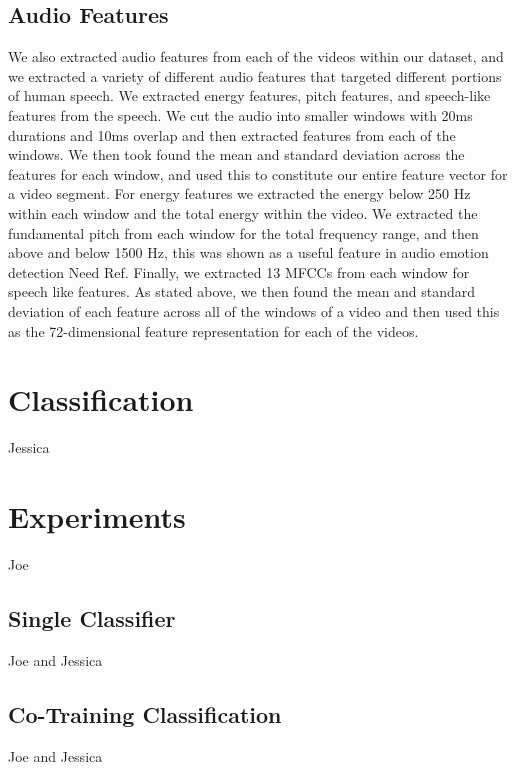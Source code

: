 \documentclass[twoside]{article}
\begin{document}
\begin{multicols}{2}
\subsection{Audio Features}
We also extracted audio features from each of the videos within our dataset, and we extracted a variety of different audio features that targeted different portions of human speech.
We extracted energy features, pitch features, and speech-like features from the speech.
We cut the audio into smaller windows with 20ms durations and 10ms overlap and then extracted features from each of the windows.
We then took found the mean and standard deviation across the features for each window, and used this to constitute our entire feature vector for a video segment.
For energy features we extracted the energy below 250 Hz within each window and the total energy within the video.
We extracted the fundamental pitch from each window for the total frequency range, and then above and below 1500 Hz, this was shown as a useful feature in audio emotion detection {\color{red}Need Ref}.
Finally, we extracted 13 MFCCs from each window for speech like features.
As stated above, we then found the mean and standard deviation of each feature across all of the windows of a video and then used this as the 72-dimensional feature representation for each of the videos.



\section{Classification}
Jessica


\section{Experiments}
Joe

\subsection{Single Classifier}
Joe and Jessica

\subsection{Co-Training Classification}
Joe and Jessica


\end{multicols}
\end{document}
